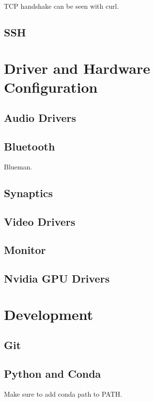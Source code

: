 \documentclass{article}
\theoremstyle{definition}
\begin{document}
    TCP handshake can be seen with curl. 

  \subsection{SSH}


\section{Driver and Hardware Configuration}

  \subsection{Audio Drivers} 


  \subsection{Bluetooth}
    Blueman. 

  \subsection{Synaptics}


  \subsection{Video Drivers}


  \subsection{Monitor}


  \subsection{Nvidia GPU Drivers} 


\section{Development}

  \subsection{Git} 
    


  \subsection{Python and Conda}

    Make sure to add conda path to PATH. 
\end{document}
